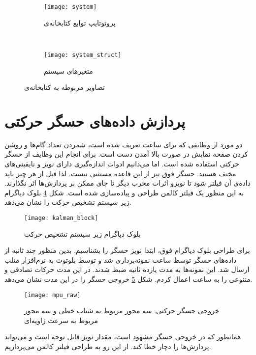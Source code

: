 \begin{figure}[h]
	\centering
	\begin{subfigure}{0.95\textwidth}
		\centering
		\texttt{[image: system]}
		\caption{پروتوتایپ توابع کتابخانه‌ی }
		\label{fig:system}
	\end{subfigure} \\
	\begin{subfigure}{0.95\textwidth}
		\centering
		\texttt{[image: system\_struct]}
		\caption{متغیرهای  سیستم}
		\label{fig:system_struct}
	\end{subfigure}
	\caption{تصاویر مربوطه به کتابخانه‌ی }
\end{figure}

\section{پردازش داده‌های حسگر حرکتی} \label{sec:kalman}
دو مورد از وظایفی که برای ساعت تعریف شده است، شمردن تعداد گام‌ها و روشن کردن صفحه نمایش در صورت بالا آمدن دست است. برای انجام این وظایف از حسگر حرکتی  استفاده شده است. اما می‌دانیم ادوات اندازه‌گیری دارای نویز و نایقینی‌های مختف هستند. حسگر فوق نیز از این قاعده مستثنی نیست. لذا قبل از هر چیز باید داده‌ی آن فیلتر شود تا نویزو اثرات مخرب دیگر تا جای ممکن بر پردازش‌ها اثر نگذارند. به این منظور یک فیلتر کالمن طراحی و پیاده‌سازی شده است. شکل \ref{fig:kalman-block} بلوک دیاگرام زیر سیستم تشخیص حرکت را نشان می‌دهد.

\begin{figure}[h]
	\centering
	\texttt{[image: kalman\_block]}
	\caption{بلوک دیاگرام زیر سیستم تشخیص حرکت}
	\label{fig:kalman-block}
\end{figure}

برای طراحی بلوک دیاگرام فوق، ابتدا نویز حسگر را بشناسیم. بدین منظور چند ثانیه از داده‌های حسگر توسط ساعت نمونه‌برداری شد و توسط بلوتوث به نرم‌افزار متلب ارسال شد. این نمونه‌ها به مدت یازده ثانیه ضبط شدند. در این مدت حرکات تصادفی و متنوعی را به ساعت اعمال کردم. شکل \ref{fig:mpu-raw} خروجی حسگر را در این مدت نشان می‌دهد.

\begin{figure}[h]
	\centering
	\texttt{[image: mpu\_raw]}
	\caption{خروجی حسگر حرکتی. سه محور مربوط به شتاب خطی و سه محور مربوط به سرعت زاویه‌ای}
	\label{fig:mpu-raw}
\end{figure}

همانطور که در خروجی حسگر مشهود است، مقدار نویز قابل توجه است و می‌تواند پردازش‌ها را دچار خطا کند. از این رو به طراحی فیلتر کالمن می‌پردازیم.

